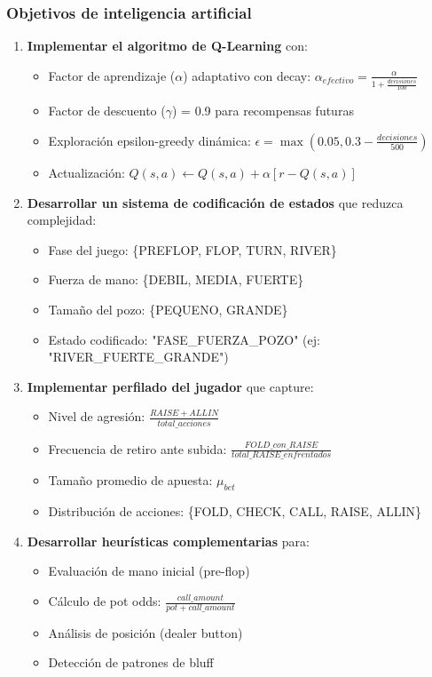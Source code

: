 \documentclass[12pt,a4paper]{article}
\begin{document}
\subsubsection{Objetivos de inteligencia artificial}

\begin{enumerate}
    \item \textbf{Implementar el algoritmo de Q-Learning} con:
    \begin{itemize}
        \item Factor de aprendizaje ($\alpha$) adaptativo con decay: $\alpha_{efectivo} = \frac{\alpha}{1 + \frac{decisiones}{100}}$
        \item Factor de descuento ($\gamma$) = 0.9 para recompensas futuras
        \item Exploración epsilon-greedy dinámica: $\epsilon = \max(0.05, 0.3 - \frac{decisiones}{500})$
        \item Actualización: $Q(s,a) \leftarrow Q(s,a) + \alpha[r - Q(s,a)]$
    \end{itemize}
    
    \item \textbf{Desarrollar un sistema de codificación de estados} que reduzca complejidad:
    \begin{itemize}
        \item Fase del juego: \{PREFLOP, FLOP, TURN, RIVER\}
        \item Fuerza de mano: \{DEBIL, MEDIA, FUERTE\}
        \item Tamaño del pozo: \{PEQUENO, GRANDE\}
        \item Estado codificado: "FASE\_FUERZA\_POZO" (ej: "RIVER\_FUERTE\_GRANDE")
    \end{itemize}
    
    \item \textbf{Implementar perfilado del jugador} que capture:
    \begin{itemize}
        \item Nivel de agresión: $\frac{RAISE + ALLIN}{total\_acciones}$
        \item Frecuencia de retiro ante subida: $\frac{FOLD\_con\_RAISE}{total\_RAISE\_enfrentados}$
        \item Tamaño promedio de apuesta: $\mu_{bet}$
        \item Distribución de acciones: \{FOLD, CHECK, CALL, RAISE, ALLIN\}
    \end{itemize}
    
    \item \textbf{Desarrollar heurísticas complementarias} para:
    \begin{itemize}
        \item Evaluación de mano inicial (pre-flop)
        \item Cálculo de pot odds: $\frac{call\_amount}{pot + call\_amount}$
        \item Análisis de posición (dealer button)
        \item Detección de patrones de bluff
    \end{itemize}
\end{enumerate}
\end{document}
